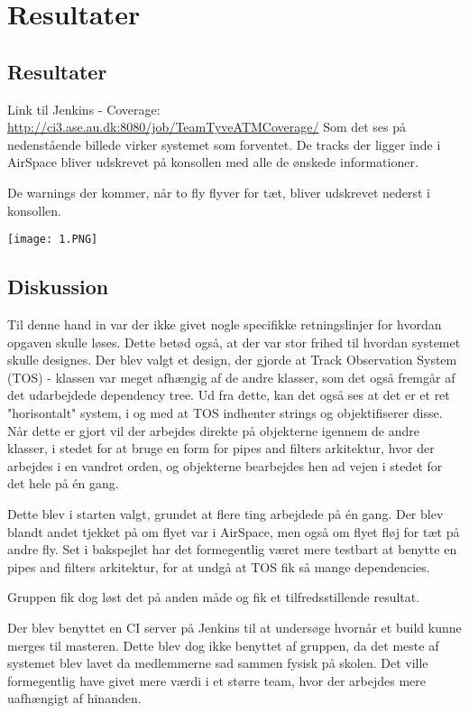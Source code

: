 \graphicspath{{Billeder/}}
\chapter{Resultater}

\section{Resultater}
Link til Jenkins - Coverage: \url{http://ci3.ase.au.dk:8080/job/TeamTyveATMCoverage/} \newline
Som det ses på nedenstående billede virker systemet som forventet. De tracks der ligger inde i AirSpace bliver udskrevet på konsollen med alle de ønskede informationer.

De warnings der kommer, når to fly flyver for tæt, bliver udskrevet nederst i konsollen.

\texttt{[image: 1.PNG]}

\section{Diskussion}
Til denne hand in var der ikke givet nogle specifikke retningslinjer for hvordan opgaven skulle løses. Dette betød også, at der var stor frihed til hvordan systemet skulle designes. \tabularnewline
Der blev valgt et design, der gjorde at Track Observation System (TOS) - klassen var meget afhængig af de andre klasser, som det også fremgår af det udarbejdede dependency tree. 
Ud fra dette, kan det også ses at det er et ret "horisontalt" system, i og med at TOS indhenter strings og objektifiserer disse. 
Når dette er gjort vil der arbejdes direkte på objekterne igennem de andre klasser, i stedet for at bruge en form for pipes and filters arkitektur, hvor der arbejdes i en vandret orden, og objekterne bearbejdes hen ad vejen i stedet for det hele på én gang. 

Dette blev i starten valgt, grundet at flere ting arbejdede på én gang. Der blev blandt andet tjekket på om flyet var i AirSpace, men også om flyet fløj for tæt på andre fly. \tabularnewline
Set i bakspejlet har det formegentlig været mere testbart at benytte en pipes and filters arkitektur, for at undgå at TOS fik så mange dependencies.

Gruppen fik dog løst det på anden måde og fik et tilfredsstillende resultat.


Der blev benyttet en CI server på Jenkins til at undersøge hvornår et build kunne merges til masteren. \tabularnewline
Dette blev dog ikke benyttet af gruppen, da det meste af systemet blev lavet da medlemmerne sad sammen fysisk på skolen.\tabularnewline
Det ville formegentlig have givet mere værdi i et større team, hvor der arbejdes mere uafhængigt af hinanden. \newline

